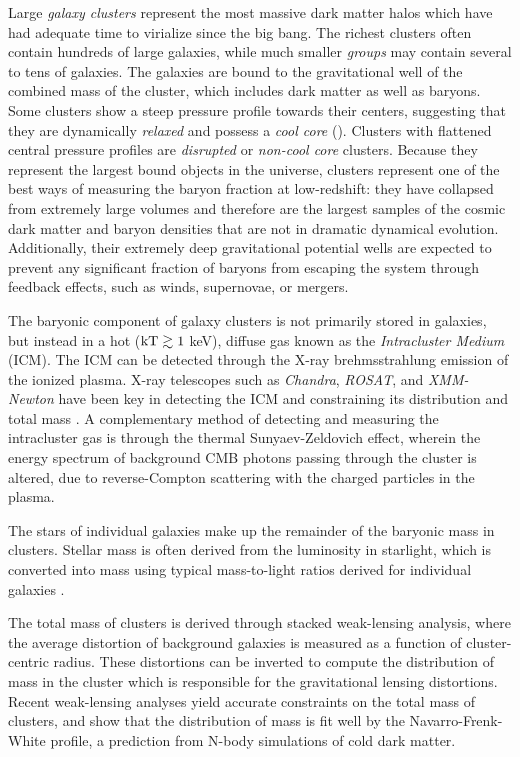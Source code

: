 Large \textit{galaxy clusters} represent the most massive dark matter
halos which have had adequate time to virialize since the big
bang. The richest clusters often contain hundreds of large galaxies,
while much smaller \textit{groups} may contain several to tens of
galaxies. The galaxies are bound to the gravitational well of the
combined mass of the cluster, which includes dark matter as well as
baryons. Some clusters show a steep pressure profile towards their
centers, suggesting that they are dynamically \textit{relaxed} and
possess a \textit{cool core} (). Clusters with
flattened central pressure profiles are \textit{disrupted}  or
\textit{non-cool core} clusters. Because they represent the largest
bound objects in the universe, clusters represent one of the best ways
of measuring the baryon fraction at low-redshift: they have collapsed
from extremely large volumes and therefore are the largest samples of
the cosmic dark matter and baryon densities that are not in dramatic
dynamical evolution. Additionally, their extremely deep gravitational
potential wells are expected to prevent any significant fraction of
baryons from escaping the system through feedback effects, such as
winds, supernovae, or mergers.

The baryonic component of galaxy clusters is not primarily stored in
galaxies, but instead in a hot ($\textrm{kT} \gtrsim 1$ keV), diffuse
gas known as the \textit{Intracluster Medium} (ICM). The ICM can be
detected through the X-ray brehmsstrahlung emission of the ionized
plasma. X-ray telescopes such as \textit{Chandra}, \textit{ROSAT}, and
\textit{XMM-Newton} have been key in detecting the ICM and
constraining its distribution and total mass . A complementary method
of detecting and measuring the intracluster gas is through the thermal
Sunyaev-Zeldovich \citep[SZ,][]{Sunyaev1972} effect, wherein the
energy spectrum of background CMB photons passing through the cluster
is altered, due to reverse-Compton scattering with the charged
particles in the plasma.

The stars of individual galaxies make up the remainder of the baryonic
mass in clusters. Stellar mass is often derived from the luminosity in
starlight, which is converted into mass using typical mass-to-light
ratios derived for individual galaxies \citep{Bahcall2014}.

The total mass of clusters is derived through stacked weak-lensing
analysis, where the average distortion of background galaxies is
measured as a function of cluster-centric radius. These distortions
can be inverted to compute the distribution of mass in the cluster
which is responsible for the gravitational lensing distortions. Recent
weak-lensing analyses \citep{Mandelbaum2008, Sheldon2009a} yield
accurate constraints on the total mass of clusters, and show that the
distribution of mass is fit well by the Navarro-Frenk-White
\citep[NFW,][]{Navarro1996} profile, a prediction from N-body
simulations of cold dark matter.


